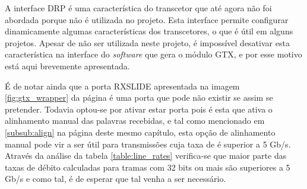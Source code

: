 A interface DRP é uma característica do transcetor que até agora não foi abordada porque não é utilizada no projeto. Esta interface permite configurar dinamicamente algumas características dos transcetores, o que é útil em alguns projetos. Apesar de não ser utilizada neste projeto, é impossível desativar esta característica na interface do \textit{software} que gera o módulo GTX, e por esse motivo está aqui brevemente apresentada.

É de notar ainda que a porta RXSLIDE apresentada na imagem \ref{fig:gtx_wrapper} da página \pageref{fig:gtx_wrapper} é uma porta que pode não existir se assim se pretender. Todavia optou-se por ativar estar porta pois é esta que ativa o alinhamento manual das palavras recebidas, e tal como mencionado em 
\ref{subsub:align} na página \pageref{subsub:align} deste mesmo capítulo, esta opção de alinhamento manual pode vir a ser útil para transmissões cuja taxa de é superior a 5 Gb/s. Através da análise da tabela \ref{table:line_rates} verifica-se que maior parte das taxas de débito calculadas para tramas com 32 bits ou mais são superiores a 5 Gb/s e como tal, é de esperar que tal venha a ser necessário.







%
%
%
%
%
%
%









